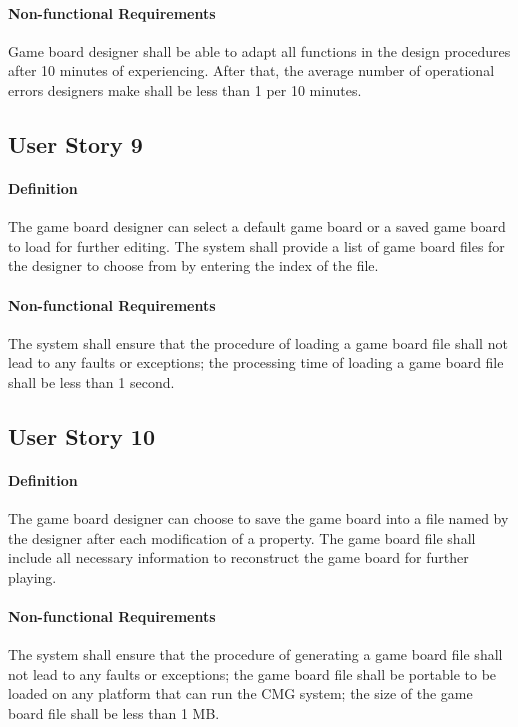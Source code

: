 \documentclass{article}
\begin{document}
\paragraph{Non-functional Requirements} 
Game board designer shall be able to adapt all functions in the design procedures after 10 minutes of experiencing.
After that, the average number of operational errors designers make shall be less than 1 per 10 minutes.

\subsection{User Story 9}
\paragraph{Definition} The game board designer can select a default game board or a saved game board to load for further editing.
The system shall provide a list of game board files for the designer to choose from by entering the index of the file.
\paragraph{Non-functional Requirements} The system shall ensure that the procedure of loading a game board file shall not lead to any faults or exceptions;
the processing time of loading a game board file shall be less than 1 second.

\subsection{User Story 10}
\paragraph{Definition} The game board designer can choose to save the game board into a file named by the designer after each modification of a property.
The game board file shall include all necessary information to reconstruct the game board for further playing.
\paragraph{Non-functional Requirements} The system shall ensure that the procedure of generating a game board file shall not lead to any faults or exceptions;
the game board file shall be portable to be loaded on any platform that can run the CMG system; the size of the game board file shall be less than 1 MB.
\end{document}
